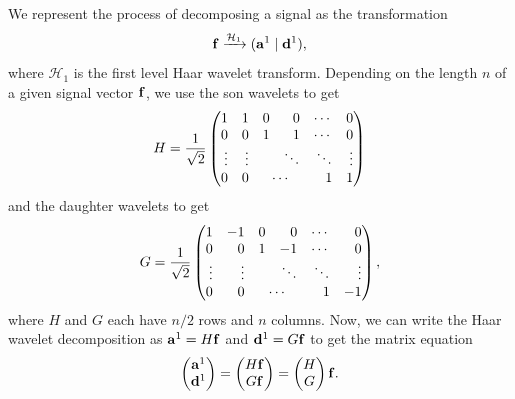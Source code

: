 \documentclass{article}
\theoremstyle{definition}
\begin{document}
  We represent the process of decomposing a signal as the transformation
  \begin{equation}
    \vb{f} \xrightarrow{\mathcal{H}_1} (\vb{a}^1 \mid \vb{d}^1),
  \end{equation}
  where \(\mathcal{H}_1\) is the first level Haar wavelet transform.
  Depending on the length \(n\) of a given signal vector \(\vb{f}\), we use the son wavelets to get
  \begin{equation}
    H = \frac{1}{\sqrt{2}}
    \begin{pmatrix*}[r]
      1 & 1 & 0 & 0 & \cdots & 0\\
      0 & 0 & 1 & 1 & \cdots & 0\\
      \vdots & \vdots &  & \ddots & \ddots & \vdots\\
      0 & 0 & \multicolumn{2}{c}{\cdots} & 1 & 1
    \end{pmatrix*}
  \end{equation}
  and the daughter wavelets to get
  \begin{equation}
    G = \frac{1}{\sqrt{2}}
    \begin{pmatrix*}[r]
      1 & -1 & 0 & 0 & \cdots & 0\\
      0 & 0 & 1 & -1 & \cdots & 0\\
      \vdots & \vdots &  & \ddots & \ddots & \vdots\\
      0 & 0 & \multicolumn{2}{c}{\cdots} & 1 & -1
    \end{pmatrix*},
  \end{equation}
  where \(H\) and \(G\) each have \(n/2\) rows and \(n\) columns. Now, we can write the Haar wavelet decomposition as \(\vb{a}^1 = H \vb{f}\) and \(\vb{d}^1 = G\vb{f}\) to get the matrix equation
  \begin{equation}
    \begin{pmatrix}
      \vb{a}^1 \\ \vb{d}^1
    \end{pmatrix} =
    \begin{pmatrix}
      H\vb{f} \\ G\vb{f}
    \end{pmatrix} =
    \begin{pmatrix}
      H \\ G
    \end{pmatrix} \vb{f}.
  \end{equation}
\end{document}
